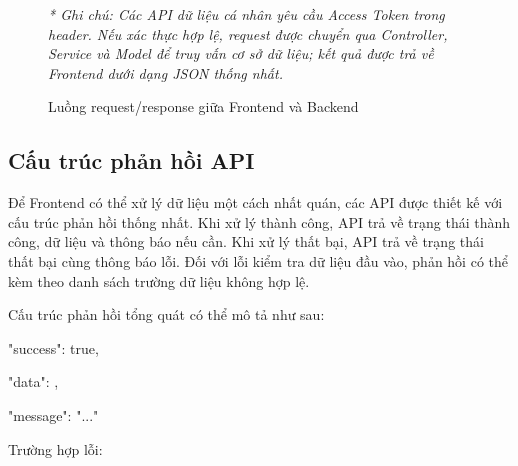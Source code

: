 \documentclass[12pt, a4paper]{report}
\begin{document}
\begin{figure}[htbp]
{
    }
    \caption{Luồng request/response giữa Frontend và Backend}
    \label{fig:api_flow}
    
    \vspace{0.2cm}
    \small \textit{* Ghi chú: Các API dữ liệu cá nhân yêu cầu Access Token trong header. Nếu xác thực hợp lệ, request được chuyển qua Controller, Service và Model để truy vấn cơ sở dữ liệu; kết quả được trả về Frontend dưới dạng JSON thống nhất.}
\end{figure}

\subsection{Cấu trúc phản hồi API}Để Frontend có thể xử lý dữ liệu một cách nhất quán, các API được thiết kế với cấu trúc phản hồi thống nhất. Khi xử lý thành công, API trả về trạng thái thành công, dữ liệu và thông báo nếu cần. Khi xử lý thất bại, API trả về trạng thái thất bại cùng thông báo lỗi. Đối với lỗi kiểm tra dữ liệu đầu vào, phản hồi có thể kèm theo danh sách trường dữ liệu không hợp lệ.

Cấu trúc phản hồi tổng quát có thể mô tả như sau:

{

  "success": true,

  "data": {},

  "message": "..."

}

Trường hợp lỗi:
\end{document}
